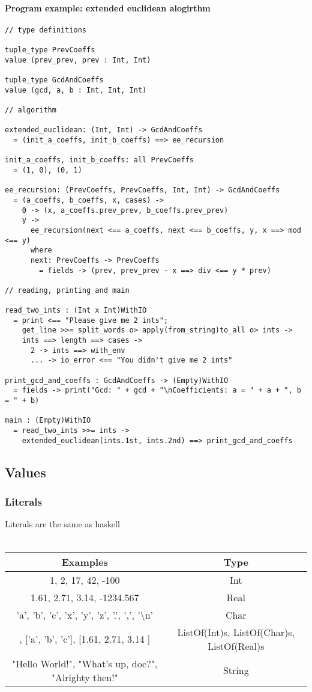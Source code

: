 \documentclass{article}
\begin{document}
\paragraph{Program example: extended euclidean alogirthm}
\begin{verbatim}
// type definitions

tuple_type PrevCoeffs
value (prev_prev, prev : Int, Int)

tuple_type GcdAndCoeffs
value (gcd, a, b : Int, Int, Int)

// algorithm

extended_euclidean: (Int, Int) -> GcdAndCoeffs
  = (init_a_coeffs, init_b_coeffs) ==> ee_recursion

init_a_coeffs, init_b_coeffs: all PrevCoeffs
  = (1, 0), (0, 1)

ee_recursion: (PrevCoeffs, PrevCoeffs, Int, Int) -> GcdAndCoeffs
  = (a_coeffs, b_coeffs, x, cases) ->
    0 -> (x, a_coeffs.prev_prev, b_coeffs.prev_prev)
    y ->
      ee_recursion(next <== a_coeffs, next <== b_coeffs, y, x ==> mod <== y)
      where
      next: PrevCoeffs -> PrevCoeffs
        = fields -> (prev, prev_prev - x ==> div <== y * prev)

// reading, printing and main

read_two_ints : (Int x Int)WithIO
  = print <== "Please give me 2 ints";
    get_line >>= split_words o> apply(from_string)to_all o> ints ->
    ints ==> length ==> cases ->
      2 -> ints ==> with_env
      ... -> io_error <== "You didn't give me 2 ints"
 
print_gcd_and_coeffs : GcdAndCoeffs -> (Empty)WithIO
  = fields -> print("Gcd: " + gcd + "\nCoefficients: a = " + a + ", b = " + b)

main : (Empty)WithIO
  = read_two_ints >>= ints ->
    extended_euclidean(ints.1st, ints.2nd) ==> print_gcd_and_coeffs
\end{verbatim}

\subsection{Values}

\subsubsection{Literals}

Literals are the same as haskell \\ \\
\begin{tabular}{ |c|c| } 
\hline
Examples & Type \\ 
\hline
\hline
1, 2, 17, 42, -100 & Int \\ 
\hline
1.61, 2.71, 3.14, -1234.567 & Real \\ 
\hline
'a', 'b', 'c', 'x', 'y', 'z', '.', ',', '\textbackslash n' & Char \\
\hline
[1, 2, 3], ['a', 'b', 'c'], [1.61, 2.71, 3.14 ] &
ListOf(Int)s, ListOf(Char)s, ListOf(Real)s \\
\hline
"Hello World!", "What's up, doc?", "Alrighty then!" & String \\
\hline
\end{tabular}
\end{document}
